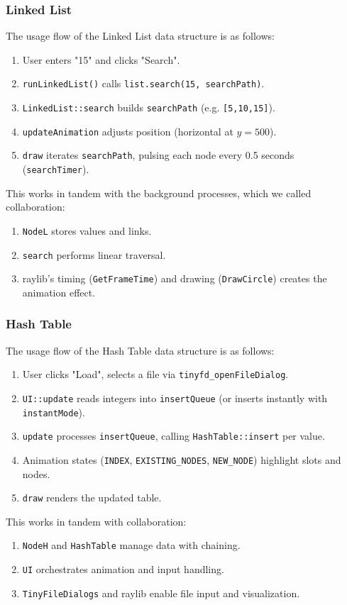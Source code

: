 \documentclass{article}
\begin{document}
\subsubsection{Linked List}
The usage flow of the Linked List data structure is as follows:
\begin{enumerate}
	\item User enters "15" and clicks "Search".
	\item \lstinline|runLinkedList()| calls \lstinline|list.search(15, searchPath)|.
	\item \lstinline|LinkedList::search| builds \lstinline|searchPath| (e.g. \lstinline|[5,10,15]|).
	\item \lstinline|updateAnimation| adjusts position (horizontal at $y = 500$).
	\item \lstinline|draw| iterates \lstinline|searchPath|, pulsing each node every 0.5 seconds (\lstinline|searchTimer|).
\end{enumerate}
This works in tandem with the background processes, which we called collaboration:
\begin{enumerate}
	\item \lstinline|NodeL| stores values and links.
	\item \lstinline|search| performs linear traversal.
	\item raylib's timing (\lstinline|GetFrameTime|) and drawing (\lstinline|DrawCircle|) creates the animation effect.
\end{enumerate}

\subsubsection{Hash Table}
The usage flow of the Hash Table data structure is as follows:
\begin{enumerate}
	\item User clicks "Load", selects a file via \lstinline|tinyfd_openFileDialog|.
	\item \lstinline|UI::update| reads integers into \lstinline|insertQueue| (or inserts instantly with \lstinline|instantMode|).
	\item \lstinline|update| processes \lstinline|insertQueue|, calling \lstinline|HashTable::insert| per value.
	\item Animation states (\lstinline|INDEX|, \lstinline|EXISTING_NODES|, \lstinline|NEW_NODE|) highlight slots and nodes.
	\item \lstinline|draw| renders the updated table.
\end{enumerate}
This works in tandem with collaboration:
\begin{enumerate}
	\item \lstinline|NodeH| and \lstinline|HashTable| manage data with chaining.
	\item \lstinline|UI| orchestrates animation and input handling.
	\item \lstinline|TinyFileDialogs| and raylib enable file input and visualization.
\end{enumerate}
\end{document}
